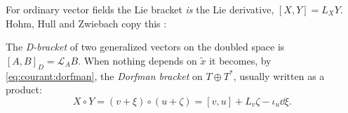 For ordinary vector fields the Lie bracket \emph{is} the Lie derivative, $[X,Y]=L_XY$. Hohm, Hull
and Zwiebach copy this :

\begin{definition}\label{def:courant:dorfman}
%
The \emph{D-bracket} of two generalized vectors on the doubled space is
$[A,B]_D=\mathcal L_AB$. When nothing depends on $\tilde x$ it becomes, by
\eqref{eq:courant:dorfman}, the \emph{Dorfman bracket} on $T\oplus T^*$, usually written as a
product:
\begin{equation}\label{eq:courant:dorfman-def}
X\circ Y=(v+\xi)\circ(u+\zeta)=[v,u]+L_v\zeta-\iota_u\dd\xi .
\end{equation}
\end{definition}

